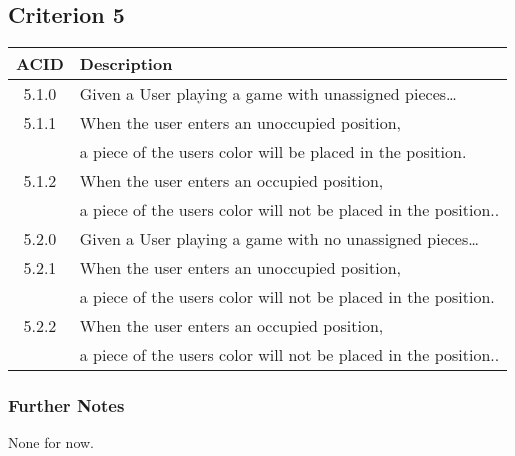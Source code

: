 \documentclass[11pt]{article}
\begin{document}
\subsection{Criterion 5}
\label{sec:org50f1674}
\begin{center}
\begin{tabular}{|c|l|}
ACID & Description\\
\hline
5.1.0 & Given a User playing a game with unassigned pieces\ldots{}\\
\hline
5.1.1 & When the user enters an unoccupied position,\\
 & a piece of the users color will be placed in the position.\\
5.1.2 & When the user enters an occupied position,\\
 & a piece of the users color will not be placed in the position..\\
\hline
5.2.0 & Given a User playing a game with no unassigned pieces\ldots{}\\
\hline
5.2.1 & When the user enters an unoccupied position,\\
 & a piece of the users color will not be placed in the position.\\
5.2.2 & When the user enters an occupied position,\\
 & a piece of the users color will not be placed in the position..\\
\end{tabular}
\end{center}

\subsubsection*{Further Notes}
\label{sec:orga752c00}
None for now.
\end{document}
